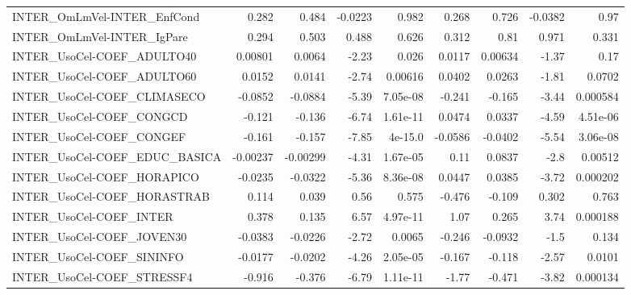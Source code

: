 \begin{tabular}{lrrrrrrrr}
INTER\_OmLmVel-INTER\_EnfCond           &       0.282 &        0.484 & -0.0223 &    0.982 &      0.268 &       0.726 &      -0.0382 &          0.97 \\
INTER\_OmLmVel-INTER\_IgPare            &       0.294 &        0.503 &   0.488 &    0.626 &      0.312 &        0.81 &        0.971 &         0.331 \\
INTER\_UsoCel-COEF\_ADULTO40            &     0.00801 &       0.0064 &   -2.23 &    0.026 &     0.0117 &     0.00634 &        -1.37 &          0.17 \\
INTER\_UsoCel-COEF\_ADULTO60            &      0.0152 &       0.0141 &   -2.74 &  0.00616 &     0.0402 &      0.0263 &        -1.81 &        0.0702 \\
INTER\_UsoCel-COEF\_CLIMASECO           &     -0.0852 &      -0.0884 &   -5.39 & 7.05e-08 &     -0.241 &      -0.165 &        -3.44 &      0.000584 \\
INTER\_UsoCel-COEF\_CONGCD              &      -0.121 &       -0.136 &   -6.74 & 1.61e-11 &     0.0474 &      0.0337 &        -4.59 &      4.51e-06 \\
INTER\_UsoCel-COEF\_CONGEF              &      -0.161 &       -0.157 &   -7.85 &  4e-15.0 &    -0.0586 &     -0.0402 &        -5.54 &      3.06e-08 \\
INTER\_UsoCel-COEF\_EDUC\_BASICA         &    -0.00237 &     -0.00299 &   -4.31 & 1.67e-05 &       0.11 &      0.0837 &         -2.8 &       0.00512 \\
INTER\_UsoCel-COEF\_HORAPICO            &     -0.0235 &      -0.0322 &   -5.36 & 8.36e-08 &     0.0447 &      0.0385 &        -3.72 &      0.000202 \\
INTER\_UsoCel-COEF\_HORASTRAB           &       0.114 &        0.039 &    0.56 &    0.575 &     -0.476 &      -0.109 &        0.302 &         0.763 \\
INTER\_UsoCel-COEF\_INTER               &       0.378 &        0.135 &    6.57 & 4.97e-11 &       1.07 &       0.265 &         3.74 &      0.000188 \\
INTER\_UsoCel-COEF\_JOVEN30             &     -0.0383 &      -0.0226 &   -2.72 &   0.0065 &     -0.246 &     -0.0932 &         -1.5 &         0.134 \\
INTER\_UsoCel-COEF\_SININFO             &     -0.0177 &      -0.0202 &   -4.26 & 2.05e-05 &     -0.167 &      -0.118 &        -2.57 &        0.0101 \\
INTER\_UsoCel-COEF\_STRESSF4            &      -0.916 &       -0.376 &   -6.79 & 1.11e-11 &      -1.77 &      -0.471 &        -3.82 &      0.000134 \\

\end{tabular}
